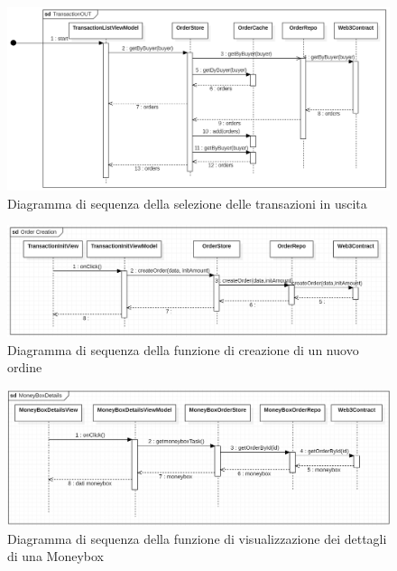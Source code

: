 \begin{landscape}
    \begin{figure}[H]
        \begin{center}
        \includegraphics[scale=0.7]{immagini/TransactionOUT.png}
        \caption{Diagramma di sequenza della selezione delle transazioni in uscita}
        \end{center}
    \end{figure}
\end{landscape}

\begin{figure}[H]
    \begin{center}
    \includegraphics[width=\textwidth]{immagini/ordercreation.png}
    \caption{Diagramma di sequenza della funzione di creazione di un nuovo ordine}
    \end{center}
\end{figure}

\begin{figure}[H]
    \begin{center}
    \includegraphics[width=\textwidth]{immagini/moneyboxdetails.png}
    \caption{Diagramma di sequenza della funzione di visualizzazione dei dettagli di una Moneybox}
    \end{center}
\end{figure}

